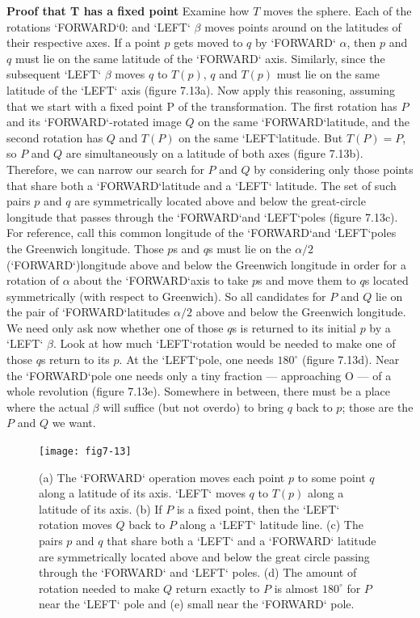 \documentclass{book}
\begin{document}
\textbf{Proof that T has a fixed point} Examine how $T$ moves the sphere. Each
of the rotations \textsc{`FORWARD`}0: and \textsc{`LEFT`} $\beta$ moves points around on the
latitudes of their respective axes. If a point $p$ gets moved to $q$ by
\textsc{`FORWARD`} $\alpha$, then $p$ and $q$ must lie on the same latitude of the \textsc{`FORWARD`}
axis. Similarly, since the subsequent \textsc{`LEFT`} $\beta$ moves $q$ to $T(p)$, $q$ and
$T(p)$ must lie on the same latitude of the \textsc{`LEFT`} axis (figure 7.13a). Now
apply this reasoning, assuming that we start with a fixed point P of
the transformation. The first rotation has $P$ and its \textsc{`FORWARD`}-rotated
image $Q$ on the same \textsc{`FORWARD`}latitude, and the second rotation has $Q$
and $T(P)$ on the same \textsc{`LEFT`}latitude. But $T(P) = P$, so $P$ and $Q$ are
simultaneously on a latitude of both axes (figure 7.13b). Therefore, we
can narrow our search for $P$ and $Q$ by considering only those points
that share both a \textsc{`FORWARD`}latitude and a \textsc{`LEFT`} latitude. The set of
such pairs $p$ and $q$ are symmetrically located above and below the great-circle longitude that passes through the \textsc{`FORWARD`}and \textsc{`LEFT`}poles (figure
7.13c). For reference, call this common longitude of the \textsc{`FORWARD`}and
\textsc{`LEFT`}poles the Greenwich longitude. Those $p$s and $q$s must lie on the
$\alpha / 2$ (\textsc{`FORWARD`})longitude above and below the Greenwich longitude in
order for a rotation of $\alpha$ about the \textsc{`FORWARD`}axis to take $p$s and move
them to $q$s located symmetrically (with respect to Greenwich). So all
candidates for $P$ and $Q$ lie on the pair of \textsc{`FORWARD`}latitudes $\alpha / 2$ above
and below the Greenwich longitude. We need only ask now whether one
of those $q$s is returned to its initial $p$ by a \textsc{`LEFT`} $\beta$. Look at how much
\textsc{`LEFT`}rotation would be needed to make one of those $q$s return to its $p$.
At the \textsc{`LEFT`}pole, one needs $180^{\circ}$ (figure 7.13d). Near the \textsc{`FORWARD`}pole
one needs only a tiny fraction --- approaching O --- of a whole revolution
(figure 7.13e). Somewhere in between, there must be a place where the
actual $\beta$ will suffice (but not overdo) to bring $q$ back to $p$; those are the
$P$ and $Q$ we want.

\begin{figure}
\begin{center}
\texttt{[image: fig7-13]}
\caption{(a) The \textsc{`FORWARD`} operation moves each point $p$ to some point $q$ along a latitude of its axis. \textsc{`LEFT`} moves $q$ to $T(p)$ along a latitude of its axis. (b) If $P$ is a fixed point, then the \textsc{`LEFT`} rotation moves $Q$ back to $P$ along a \textsc{`LEFT`} latitude line. (c) The pairs $p$ and $q$ that share both a \textsc{`LEFT`} and a \textsc{`FORWARD`} latitude are symmetrically located above and below the great circle passing through the \textsc{`FORWARD`} and \textsc{`LEFT`} poles. (d) The amount of rotation needed to make $Q$ return exactly to $P$ is almost $180^{\circ}$ for $P$ near the \textsc{`LEFT`} pole and (e) small near the \textsc{`FORWARD`} pole.
}
\end{center}
\end{figure}
\end{document}

